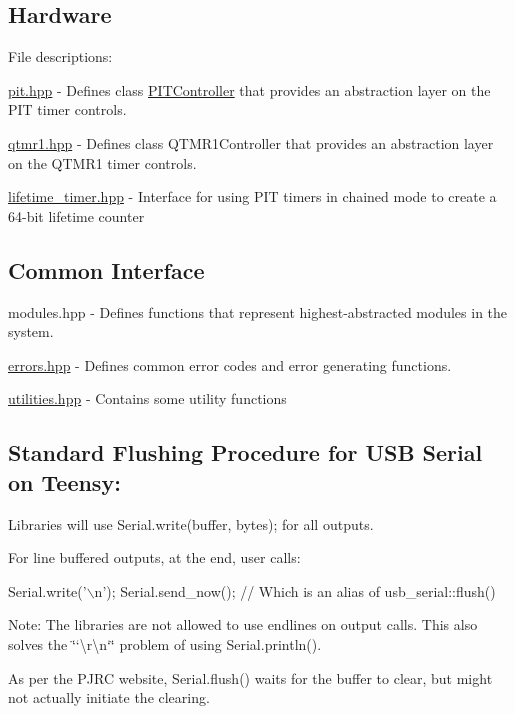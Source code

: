 \subsection*{Hardware}

File descriptions\+:


\begin{DoxyItemize}
\item {\ttfamily \hyperlink{pit_8hpp}{pit.\+hpp}} -\/ Defines {\ttfamily class \hyperlink{classPITController}{P\+I\+T\+Controller}} that provides an abstraction layer on the P\+IT timer controls.
\item {\ttfamily \hyperlink{qtmr1_8hpp}{qtmr1.\+hpp}} -\/ Defines \textquotesingle{}class Q\+T\+M\+R1\+Controller\textquotesingle{} that provides an abstraction layer on the Q\+T\+M\+R1 timer controls.
\item {\ttfamily \hyperlink{lifetime__timer_8hpp}{lifetime\+\_\+timer.\+hpp}} -\/ Interface for using P\+IT timers in chained mode to create a 64-\/bit lifetime counter
\end{DoxyItemize}

\subsection*{Common Interface}


\begin{DoxyItemize}
\item {\ttfamily modules.\+hpp} -\/ Defines functions that represent highest-\/abstracted modules in the system.
\item {\ttfamily \hyperlink{errors_8hpp}{errors.\+hpp}} -\/ Defines common error codes and error generating functions.
\item {\ttfamily \hyperlink{utilities_8hpp}{utilities.\+hpp}} -\/ Contains some utility functions
\end{DoxyItemize}

\subsection*{Standard Flushing Procedure for U\+SB Serial on Teensy\+:}


\begin{DoxyItemize}
\item Libraries will use {\ttfamily Serial.\+write(buffer, bytes);} for all outputs.
\item For line buffered outputs, at the end, user calls\+: 
\begin{DoxyCode}
Serial.write('\(\backslash\)n');
Serial.send\_now(); // Which is an alias of usb\_serial::flush()
\end{DoxyCode}

\item Note\+: The libraries are not allowed to use endlines on output calls. This also solves the \char`\"{}`\textbackslash{}r\textbackslash{}n`\char`\"{} problem of using {\ttfamily Serial.\+println()}.
\item As per the P\+J\+RC website, {\ttfamily Serial.\+flush()} waits for the buffer to clear, but might not actually initiate the clearing.
\end{DoxyItemize}


